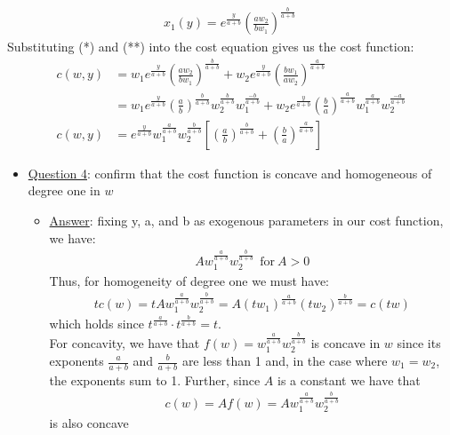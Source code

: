 \documentclass{article}
\begin{document}
\begin{itemize}
\begin{itemize}
\begin{gather*}
        x_{1}(y) = e^{\tfrac{y}{a+b}} (\frac{aw_{2}}{bw_{1}})^{\tfrac{b}{a + b}} \ \tag{**}
      \end{gather*}
      Substituting (*) and (**) into the cost equation gives us the cost function:
      \begin{align*}
        c(w,y) &= w_{1}e^{\tfrac{y}{a + b}}(\frac{aw_{2}}{bw_{1}})^{\tfrac{b}{a+b}} + w_{2}e^{\tfrac{y}{a + b}}(\frac{bw_{1}}{aw_{2}})^{\tfrac{a}{a+b}} \\
        &= w_{1}e^{\tfrac{y}{a+b}} (\frac{a}{b})^{\tfrac{b}{a+b}} w_{2}^{\tfrac{b}{a+b}}w_{1}^{\tfrac{-b}{a+b}} + w_{2}e^{\tfrac{y}{a+b}} (\frac{b}{a})^{\tfrac{a}{a+b}} w_{1}^{\tfrac{a}{a+b}} w_{2}^{\tfrac{-a}{a+b}} \\
        c(w,y) &= e^{\tfrac{y}{a+b}} w_{1}^{\tfrac{a}{a+b}} w_{2}^{\tfrac{b}{a+b}} [(\frac{a}{b})^{\tfrac{b}{a+b}} + (\frac{b}{a})^{\tfrac{a}{a+b}}]
      \end{align*}
    \end{itemize}
  \end{itemize}
  \begin{itemize}
    \item  \underline{Question 4}: confirm that the cost function is concave and homogeneous of degree one in $w$
    \begin{itemize}
      \item  \underline{Answer}: fixing y, a, and b as exogenous parameters in our cost function, we have:
      \begin{gather*}
        Aw_{1}^{\tfrac{a}{a+b}}w_{2}^{\tfrac{b}{a+b}} \ \ \text{for} \ A >0
      \end{gather*}
      Thus, for homogeneity of degree one we must have:
      \begin{gather*}
        tc(w) = tAw_{1}^{\tfrac{a}{a+b}} w_{2}^{\tfrac{b}{a+b}} = A(tw_{1})^{\tfrac{a}{a+b}} (tw_{2})^{\tfrac{b}{a+b}} = c(tw)
      \end{gather*}
      which holds since $t^{\tfrac{a}{a+b}} \cdot t^{\tfrac{b}{a+b}} = t$. \\ For concavity, we have that $f(w) = w_{1}^{\tfrac{a}{a+b}}w_{2}^{\tfrac{b}{a+b}}$ is concave in $w$ since its exponents $\tfrac{a}{a+b}$ and $\tfrac{b}{a+b}$ are less than 1 and, in the case where $w_{1}=w_{2}$, the exponents sum to 1. Further, since $A$ is a constant we have that
      \begin{gather*}
        c(w) = Af(w) = Aw_{1}^{\tfrac{a}{a+b}} w_{2}^{\tfrac{b}{a+b}}
      \end{gather*}
      is also concave
    \end{itemize}
  \end{itemize}
\par
\end{document}
